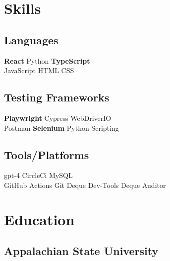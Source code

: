\documentclass[]{divine-waters-resume}
\begin{document}
\begin{minipage}[t]{0.33\textwidth}


\section{Skills}
{\subsection{Languages}
\textbf{React} \textbullet{} Python \textbullet{} \textbf{TypeScript} \\
JavaScript \textbullet{} HTML \textbullet{} CSS

\subsection{ Testing Frameworks}
\textbf{Playwright} \textbullet{} Cypress \textbullet{} WebDriverIO \\
Postman \textbullet{} \textbf{Selenium} \textbullet{} Python Scripting \\

\subsection{Tools/Platforms}
gpt-4 \textbullet{} CircleCi \textbullet{} MySQL \\
GitHub Actions \textbullet{} Git \textbullet{} Deque Dev-Tools \textbullet{} Deque Auditor
\

\sectionsep


\section{Education}

\subsection{Appalachian State University}


}
\end{minipage}
\end{document}
